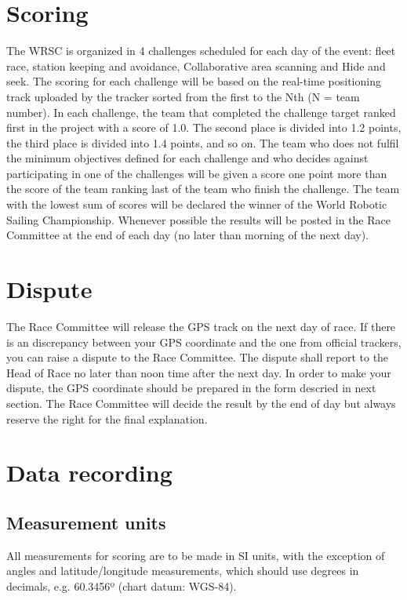 \documentclass[12pt]{article}
\begin{document}
\section{Scoring}
The WRSC is organized in 4 challenges scheduled for each day of the event: ﬂeet race, station keeping and avoidance, Collaborative area scanning and Hide and seek. 
The scoring for each challenge will be based on the real-time positioning track uploaded by the tracker sorted from the first to the Nth (N = team number). 
In each challenge, the team that completed the challenge target ranked first in the project with a score of 1.0. The second place is divided into 1.2 points, the third place is divided into 1.4 points, and so on. 
The team who does not fulfil the minimum objectives defined for each challenge and who decides against participating in one of the challenges will be given a score one point more than the score of the team ranking last of the team who finish the challenge. The team with the lowest sum of scores will be declared the winner of the World Robotic Sailing Championship. Whenever possible the results will be posted in the Race Committee at the end of each day (no later than morning of the next day). 


\section{Dispute}
The Race Committee will release the GPS track on the next day of race.
If there is an discrepancy between your GPS coordinate and the one from official trackers, you can raise a dispute to the Race Committee.
The dispute shall report to the Head of Race no later than noon time after the next day.
In order to make your dispute, the GPS coordinate should be prepared in the form descried in next section.
The Race Committee will decide the result by the end of day but always reserve the right for the final explanation.  



\section{Data recording}
\subsection{Measurement units}
All measurements for scoring are to be made in SI units, with the exception of
angles and latitude/longitude measurements, which should use degrees in
decimals, e.g. 60.3456º (chart datum: WGS-84).
\end{document}
